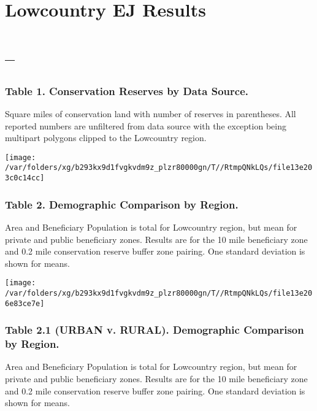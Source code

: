 \documentclass[landscape]{article}
\author{}
\date{\vspace{-2.5em}}
\begin{document}
\hypertarget{lowcountry-ej-results}{%
\section{Lowcountry EJ Results}\label{lowcountry-ej-results}}

\hypertarget{section}{%
\section{--}\label{section}}

\hypertarget{table-1.-conservation-reserves-by-data-source.}{%
\subsubsection{Table 1. Conservation Reserves by Data
Source.}\label{table-1.-conservation-reserves-by-data-source.}}

Square miles of conservation land with number of reserves in
parentheses. All reported numbers are unfiltered from data source with
the exception being multipart polygons clipped to the Lowcountry region.

\texttt{[image: /var/folders/xg/b293kx9d1fvgkvdm9z\_plzr80000gn/T//RtmpQNkLQs/file13e203c0c14cc]}

\hypertarget{table-2.-demographic-comparison-by-region.}{%
\subsubsection{Table 2. Demographic Comparison by
Region.}\label{table-2.-demographic-comparison-by-region.}}

Area and Beneficiary Population is total for Lowcountry region, but mean
for private and public beneficiary zones. Results are for the 10 mile
beneficiary zone and 0.2 mile conservation reserve buffer zone pairing.
One standard deviation is shown for means.

\texttt{[image: /var/folders/xg/b293kx9d1fvgkvdm9z\_plzr80000gn/T//RtmpQNkLQs/file13e206e83ce7e]}
\pagebreak

\hypertarget{table-2.1-urban-v.-rural.-demographic-comparison-by-region.}{%
\subsubsection{Table 2.1 (URBAN v. RURAL). Demographic Comparison by
Region.}\label{table-2.1-urban-v.-rural.-demographic-comparison-by-region.}}

Area and Beneficiary Population is total for Lowcountry region, but mean
for private and public beneficiary zones. Results are for the 10 mile
beneficiary zone and 0.2 mile conservation reserve buffer zone pairing.
One standard deviation is shown for means.
\end{document}
